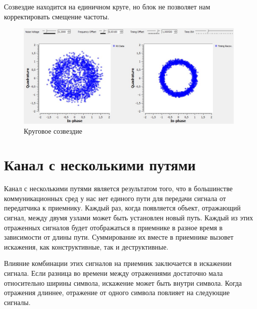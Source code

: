 \documentclass[a4paper, 12pt]{report}
\begin{document}
	Созвездие находится на единичном круге, но блок не позволяет нам корректировать смещение частоты.
	\begin{figure}[H]
		\centering
		\includegraphics[width=1.0\textwidth]{23.jpg}
		\caption{Круговое созвездие}
		\label{fig:23}
	\end{figure}
	
	\chapter{Канал с несколькими путями}
	Канал с несколькими путями является результатом того, что в большинстве коммуникационных сред у нас нет единого пути для передачи сигнала от передатчика к приемнику. Каждый раз, когда появляется объект, отражающий сигнал, между двумя узлами может быть установлен новый путь. Каждый из этих отраженных сигналов будет отображаться в приемнике в разное время в зависимости от длины пути. Суммирование их вместе в приемнике вызовет искажения, как конструктивные, так и деструктивные.

	Влияние комбинации этих сигналов на приемник заключается в искажении сигнала. Если разница во времени между отражениями достаточно мала относительно ширины символа, искажение может быть внутри символа. Когда отражения длиннее, отражение от одного символа повлияет на следующие сигналы.
\end{document}
